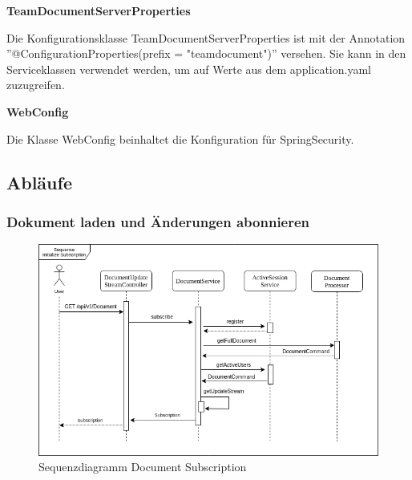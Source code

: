 \textbf{TeamDocumentServerProperties}

Die Konfigurationsklasse TeamDocumentServerProperties ist mit der Annotation ''@ConfigurationProperties(prefix = "teamdocument")'' versehen.
Sie kann in den Serviceklassen verwendet werden, um auf Werte aus dem application.yaml zuzugreifen.

\textbf{WebConfig}

Die Klasse WebConfig beinhaltet die Konfiguration für SpringSecurity.

\clearpage

\subsection{Abläufe}

\subsubsection{Dokument laden und Änderungen abonnieren}

\begin{figure}[h]
    \centering
    \begin{minipage}[b]{1\textwidth}
        \includegraphics[width=\textwidth]{graphics/seq_init_subscription.drawio}
        \caption{Sequenzdiagramm Document Subscription}
    \end{minipage}\label{fig:figureseqsub}
\end{figure}

